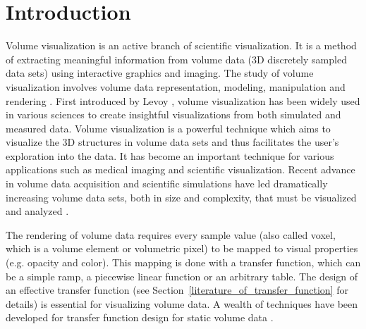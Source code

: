 \chapter{Introduction \label{section_introduction}}

Volume visualization is an active branch of scientific visualization. It is a method of extracting meaningful information from volume data (3D discretely sampled data sets) using interactive graphics and imaging. The study of volume visualization involves volume data representation, modeling, manipulation and rendering \cite{kaufman_volume_1997}.
First introduced by Levoy \cite{levoy_display_1988}, volume visualization has been widely used in various sciences to create insightful visualizations from both simulated and measured data.
Volume visualization is a powerful technique which aims to visualize the 3D structures in volume data sets and thus facilitates the user's exploration into the data. It has become an important technique for various applications such as medical imaging and scientific visualization.
Recent advance in volume data acquisition and scientific simulations have led dramatically increasing volume data sets, both in size and complexity, that must be visualized and analyzed \cite{beyer_state---art_2015}.


The rendering of volume data requires every sample value (also called voxel, which is a volume element or volumetric pixel) to be mapped to visual properties (e.g. opacity and color). This mapping is done with a transfer function, which can be a simple ramp, a piecewise linear function or an arbitrary table.
The design of an effective transfer function (see Section~\ref{literature_of_transfer_function} for details) is essential for visualizing volume data. A wealth of techniques have been developed for transfer function design for static volume data \cite{pfister_transfer_2001} \cite{bernardon_transfer-function_2008} \cite{arens_survey_2010}.

